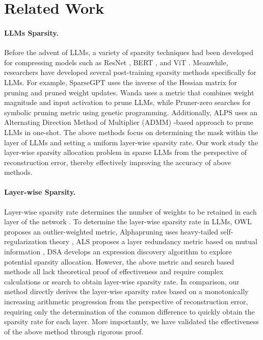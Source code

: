 \section{Related Work}
\label{RelatedWork}
\paragraph{LLMs Sparsity.} 
Before the advent of LLMs, a variety of sparsity techniques had been developed for compressing models such as ResNet \citep{yu2022combinatorial, zhang2024how} , BERT \citep{xia2022structured, li2023losparse}, and ViT \citep{yu2022width, he2024pruning}. Meanwhile, researchers have developed several post-training sparsity methods specifically for LLMs. For example, SparseGPT \citep{frantar2023sparsegpt} uses the inverse of the Hessian matrix for pruning and pruned weight updates. Wanda \citep{sun2023simple} uses a metric that combines weight magnitude and input activation to prune LLMs, while Pruner-zero \citep{dong2024pruner} searches for symbolic pruning metric using genetic programming. Additionally, ALPS \citep{meng2024alps} uses an Alternating Direction Method of Multiplier (ADMM) \citep{boyd2011distributed}-based approach to prune LLMs in one-shot. The above methods focus on determining the mask within the layer of LLMs and setting a uniform layer-wise sparsity rate. Our work study the layer-wise sparsity allocation problem in sparse LLMs from the perspective of reconstruction error, thereby effectively improving the accuracy of above methods.
\paragraph{Layer-wise Sparsity.} Layer-wise sparsity rate determines the number of weights to be retained in each layer of the network \citep{lee2020layer, liu2022unreasonable}. To determine the layer-wise sparsity rate in LLMs, OWL\citep{yin2023outlier} proposes an outlier-weighted metric, Alphapruning \citep{lu2024alphapruning} uses heavy-tailed self-regularization theory \citep{martin2019traditional}, ALS \citep{li2024adaptive} proposes a layer redundancy metric based on mutual information \citep{kraskov2004estimating}, DSA \citep{li2024discovering} develops an expression discovery algorithm to explore potential sparsity allocation. However, the above metric and search based methods all lack theoretical proof of effectiveness and require complex calculations or search to obtain layer-wise sparsity rate. In comparison, our method directly derives the layer-wise sparsity rates based on a monotonically increasing arithmetic progression from the perspective of reconstruction error, requiring only the determination of the common difference to quickly obtain the sparsity rate for each layer. More importantly, we have validated the effectiveness of the above method through rigorous proof.

